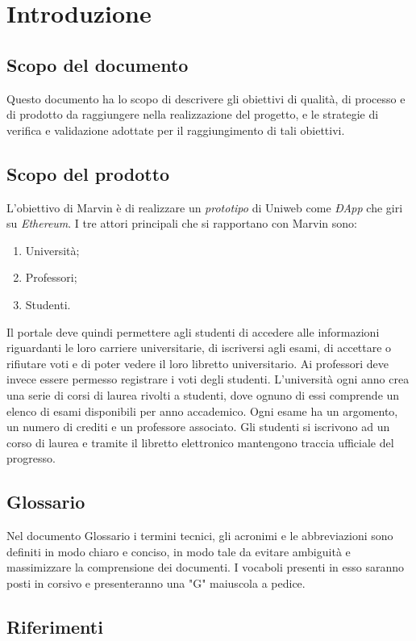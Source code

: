 \section{Introduzione}
\subsection{Scopo del documento}
Questo documento ha lo scopo di descrivere gli obiettivi di qualità, di processo e di prodotto da raggiungere nella realizzazione del progetto, e le strategie di verifica e validazione adottate per il raggiungimento di tali obiettivi.
\subsection{Scopo del prodotto}
L'obiettivo di Marvin è di realizzare un \textit{prototipo} di Uniweb come \textit{ÐApp} che giri su \textit{Ethereum}. I tre attori principali che si rapportano con Marvin sono:
\begin{enumerate}
	\item Università;
	\item Professori;
	\item Studenti.
\end{enumerate}
Il portale deve quindi permettere agli studenti di accedere alle informazioni riguardanti le loro carriere universitarie, di iscriversi agli esami, di accettare o rifiutare voti e di poter vedere il loro libretto universitario.
Ai professori deve invece essere permesso registrare i voti degli studenti.
L'università ogni anno crea una serie di corsi di laurea rivolti a studenti, dove ognuno di essi comprende un elenco di esami disponibili per anno accademico. Ogni esame ha un argomento, un numero di crediti e un professore associato. Gli studenti si iscrivono ad un corso di laurea e tramite il libretto elettronico mantengono traccia ufficiale del progresso.
\subsection{Glossario}
Nel documento Glossario i termini tecnici, gli acronimi e le abbreviazioni sono definiti in modo chiaro e conciso, in modo tale da evitare ambiguità e massimizzare la comprensione dei documenti.
\newline I vocaboli presenti in esso saranno posti in corsivo e presenteranno una "G" maiuscola a pedice.
\subsection{Riferimenti}
